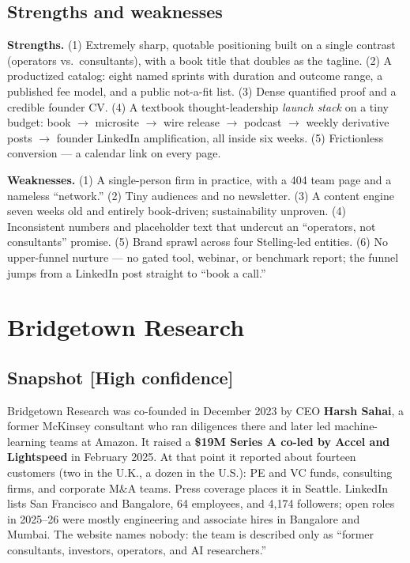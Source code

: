 \documentclass[11pt]{article}
\newcommand{\high}{\textcolor{green!45!black}{\textbf{[High confidence]}}}
\begin{document}
\subsection{Strengths and weaknesses}
\textbf{Strengths.} (1) Extremely sharp, quotable positioning built on a single
contrast (operators vs.\ consultants), with a book title that doubles as the tagline.
(2) A productized catalog: eight named sprints with duration and outcome range, a
published fee model, and a public not-a-fit list. (3) Dense quantified proof and a
credible founder CV. (4) A textbook thought-leadership \emph{launch stack} on a tiny
budget: book $\rightarrow$ microsite $\rightarrow$ wire release $\rightarrow$ podcast
$\rightarrow$ weekly derivative posts $\rightarrow$ founder LinkedIn amplification, all
inside six weeks. (5) Frictionless conversion --- a calendar link on every page.

\textbf{Weaknesses.} (1) A single-person firm in practice, with a 404 team page and a
nameless ``network.'' (2) Tiny audiences and no newsletter. (3) A content engine seven
weeks old and entirely book-driven; sustainability unproven. (4) Inconsistent numbers
and placeholder text that undercut an ``operators, not consultants'' promise. (5)
Brand sprawl across four Stelling-led entities. (6) No upper-funnel nurture --- no gated
tool, webinar, or benchmark report; the funnel jumps from a LinkedIn post straight to
``book a call.''

\section{Bridgetown Research}\label{sec:bridgetown}

\subsection{Snapshot \high}
Bridgetown Research was co-founded in December 2023 by CEO \textbf{Harsh Sahai}, a former
McKinsey consultant who ran diligences there and later led machine-learning teams at
Amazon. It raised a \textbf{\$19M Series A co-led by Accel and Lightspeed} in February
2025. At that point it reported about fourteen customers (two in the U.K., a dozen in
the U.S.): PE and VC funds, consulting firms, and corporate M\&A teams. Press coverage
places it in Seattle. LinkedIn lists San Francisco and Bangalore, 64 employees, and
4,174 followers; open roles in 2025--26 were mostly engineering and associate hires in
Bangalore and Mumbai. The website names nobody: the team is described only as ``former
consultants, investors, operators, and AI researchers.''
\end{document}
